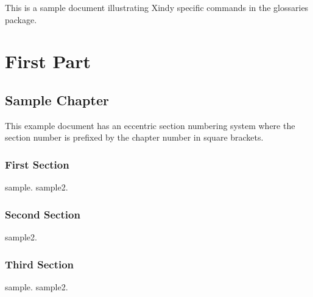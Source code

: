 \documentclass{report}
\begin{document}
This is a sample document illustrating Xindy specific commands in
the glossaries package.

\part{First Part}

\chapter{Sample Chapter}
This example document has an eccentric section numbering system
where the section number is prefixed by the chapter number in square
brackets.

\section{First Section}

\gls{sample}. \gls{sample2}.

\section{Second Section}

\gls{sample2}.

\section{Third Section}

\gls{sample}. \gls{sample2}.

\printglossaries
\end{document}
